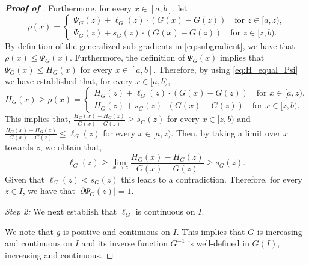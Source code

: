 \begin{proof}[\textbf{Proof of }]
Furthermore, for every $x \in [a,b]$, let
\begin{equation*}
    \rho(x) = \begin{cases}
        \Psi_{G}(z) + \ell_{G}(z) \cdot(G(x)-G(z)) \quad \text{for $z \in [a,z)$,}\\
        \Psi_{G}(z) + s_{G}(z) \cdot(G(x)-G(z)) \quad \text{for $z \in [z,b)$}.
    \end{cases}
\end{equation*}
By definition of the generalized sub-gradients in \eqref{eq:subgradient}, we have that $\rho(x) \leq \Psi_{G}(x)$. Furthermore, the definition of $\Psi_{G}(x)$ implies that $\Psi_{G}(x) \leq H_{G}(x)$ for every $x \in [a,b]$. 
Therefore, by using \eqref{eq:H_equal_Psi} we have established that, for every $x \in [a,b)$,
\begin{equation*}
    H_{G}(x) \geq \rho(x) = \begin{cases}
         H_{G}(z) + \ell_{G}(z) \cdot(G(x)-G(z)) \quad \text{for $x \in [a,z)$,}\\
         H_{G}(z) + s_{G}(z) \cdot(G(x)-G(z)) \quad \text{for $x \in [z,b)$}.
    \end{cases}
\end{equation*}
This implies that, $\frac{H_{G}(x) - H_{G}(z)}{G(x)-G(z)} \geq s_{G}(z)$ for every $x \in[z,b)$ and $\frac{H_{G}(x) - H_{G}(z)}{G(x)-G(z)} \leq \ell_{G}(z)$ for every $x \in [a,z)$. Then, by taking a limit over $x$ towards $z$, we obtain that,
\begin{equation*}
    \ell_{G}(z) \geq \lim_{x \to z} \frac{H_{G}(x) - H_{G}(z)}{G(x)-G(z)} \geq s_{G}(z).
\end{equation*}
Given that $\ell_{G}(z) <s_{G}(z)$ this leads to a contradiction. Therefore, for every $z \in I$, we have that $| \partial \Psi_{G}(z)| = 1$.


\textit{Step 2:} We next establish that $\ell_{G}$ is continuous on $I$.

We note that $g$ is positive and continuous on $I$. This implies that $G$ is increasing and continuous on $I$ and its inverse function $G^{-1}$ is well-defined in $G(I)$, increasing and continuous. 


\end{proof}
